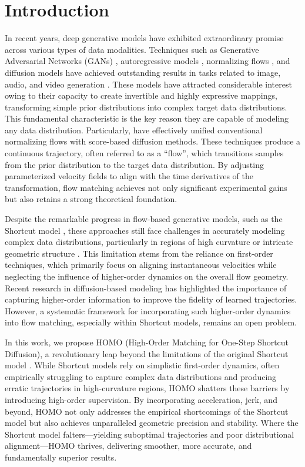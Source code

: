 \section{Introduction}


In recent years, deep generative models have exhibited extraordinary promise across various types of data modalities. Techniques such as Generative Adversarial Networks (GANs) \cite{gpm+14}, autoregressive models \cite{v17}, normalizing flows \cite{lcb+22}, and diffusion models \cite{hja20} have achieved outstanding results in tasks related to image, audio, and video generation \cite{kes+18, brl+23}. These models have attracted considerable interest owing to their capacity to create invertible and highly expressive mappings, transforming simple prior distributions into complex target data distributions. This fundamental characteristic is the key reason they are capable of modeling any data distribution. Particularly, \cite{lcb+22, lgl22} have effectively unified conventional normalizing flows with score-based diffusion methods. These techniques produce a continuous trajectory, often referred to as a ``flow'', which transitions samples from the prior distribution to the target data distribution. By adjusting parameterized velocity fields to align with the time derivatives of the transformation, flow matching achieves not only significant experimental gains but also retains a strong theoretical foundation.

Despite the remarkable progress in flow-based generative models, such as the Shortcut model \cite{fhla24}, these approaches still face challenges in accurately modeling complex data distributions, particularly in regions of high curvature or intricate geometric structure \cite{wet+24, hwa+24}. This limitation stems from the reliance on first-order techniques, which primarily focus on aligning instantaneous velocities while neglecting the influence of higher-order dynamics on the overall flow geometry. Recent research in diffusion-based modeling \cite{c23, hg24, llly24} has highlighted the importance of capturing higher-order information to improve the fidelity of learned trajectories. However, a systematic framework for incorporating such higher-order dynamics into flow matching, especially within Shortcut models, remains an open problem.

In this work, we propose HOMO (High-Order Matching for One-Step Shortcut Diffusion), a revolutionary leap beyond the limitations of the original Shortcut model \cite{fhla24}. While Shortcut models rely on simplistic first-order dynamics, often empirically struggling to capture complex data distributions and producing erratic trajectories in high-curvature regions, HOMO shatters these barriers by introducing high-order supervision. By incorporating acceleration, jerk, and beyond, HOMO not only addresses the empirical shortcomings of the Shortcut model but also achieves unparalleled geometric precision and stability. Where the Shortcut model falters—yielding suboptimal trajectories and poor distributional alignment—HOMO thrives, delivering smoother, more accurate, and fundamentally superior results.


